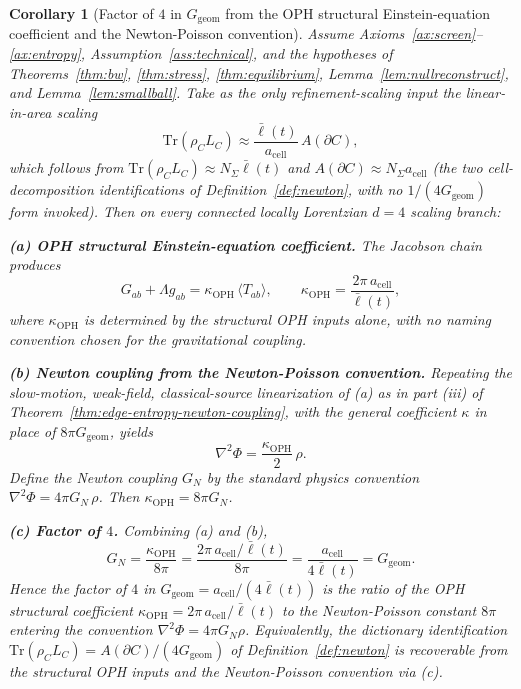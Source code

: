 \documentclass[11pt]{article}
\newtheorem{corollary}[theorem]{Corollary}
\begin{document}
\begin{corollary}[Factor of \(4\) in \(G_{\mathrm{geom}}\) from the OPH structural Einstein-equation coefficient and the Newton-Poisson convention]\label{cor:factor-of-four-derived}
Assume Axioms~\ref{ax:screen}--\ref{ax:entropy}, Assumption~\ref{ass:technical}, and the hypotheses of Theorems~\ref{thm:bw}, \ref{thm:stress}, \ref{thm:equilibrium}, Lemma~\ref{lem:nullreconstruct}, and Lemma~\ref{lem:smallball}. Take as the only refinement-scaling input the linear-in-area scaling
\[
\mathrm{Tr}(\rho_C L_C)\approx\frac{\bar\ell(t)}{a_{\mathrm{cell}}}\,A(\partial C),
\]
which follows from \(\mathrm{Tr}(\rho_C L_C)\approx N_\Sigma\bar\ell(t)\) and \(A(\partial C)\approx N_\Sigma a_{\mathrm{cell}}\) (the two cell-decomposition identifications of Definition~\ref{def:newton}, with no \(1/(4G_{\mathrm{geom}})\) form invoked). Then on every connected locally Lorentzian \(d=4\) scaling branch:

\textbf{(a) OPH structural Einstein-equation coefficient.} The Jacobson chain produces
\[
G_{ab}+\Lambda g_{ab}=\kappa_{\mathrm{OPH}}\,\langle T_{ab}\rangle,
\qquad
\kappa_{\mathrm{OPH}}=\frac{2\pi\,a_{\mathrm{cell}}}{\bar\ell(t)},
\]
where \(\kappa_{\mathrm{OPH}}\) is determined by the structural OPH inputs alone, with no naming convention chosen for the gravitational coupling.

\textbf{(b) Newton coupling from the Newton-Poisson convention.} Repeating the slow-motion, weak-field, classical-source linearization of (a) as in part (iii) of Theorem~\ref{thm:edge-entropy-newton-coupling}, with the general coefficient \(\kappa\) in place of \(8\pi G_{\mathrm{geom}}\), yields
\[
\nabla^2\Phi=\frac{\kappa_{\mathrm{OPH}}}{2}\,\rho.
\]
Define the Newton coupling \(G_N\) by the standard physics convention \(\nabla^2\Phi=4\pi G_N\,\rho\). Then \(\kappa_{\mathrm{OPH}}=8\pi G_N\).

\textbf{(c) Factor of \(4\).} Combining (a) and (b),
\[
G_N=\frac{\kappa_{\mathrm{OPH}}}{8\pi}=\frac{2\pi\,a_{\mathrm{cell}}/\bar\ell(t)}{8\pi}=\frac{a_{\mathrm{cell}}}{4\bar\ell(t)}=G_{\mathrm{geom}}.
\]
Hence the factor of \(4\) in \(G_{\mathrm{geom}}=a_{\mathrm{cell}}/(4\bar\ell(t))\) is the ratio of the OPH structural coefficient \(\kappa_{\mathrm{OPH}}=2\pi\,a_{\mathrm{cell}}/\bar\ell(t)\) to the Newton-Poisson constant \(8\pi\) entering the convention \(\nabla^2\Phi=4\pi G_N\rho\). Equivalently, the dictionary identification \(\mathrm{Tr}(\rho_C L_C)=A(\partial C)/(4G_{\mathrm{geom}})\) of Definition~\ref{def:newton} is recoverable from the structural OPH inputs and the Newton-Poisson convention via (c).
\end{corollary}
\end{document}
